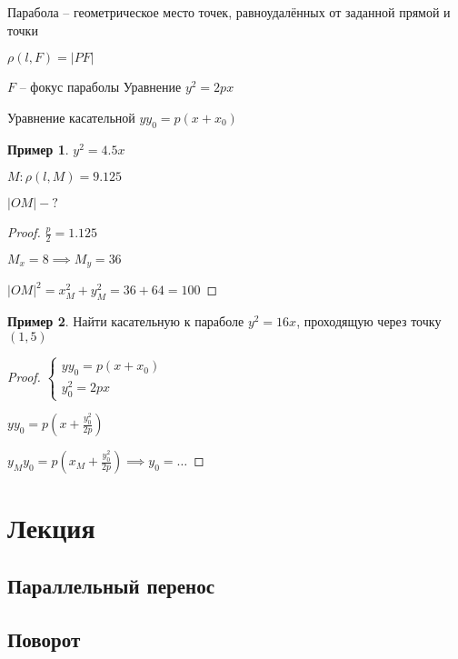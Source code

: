 \documentclass{book}
\theoremstyle{definition}
\newtheorem*{example}{Пример}
\newcommand{\incfig}[1]{%
    \def\svgwidth{\columnwidth}
    {#1.pdf_tex}
}
\begin{document}
\begin{definition}
    Парабола -- геометрическое место точек, равноудалённых от заданной прямой и точки

    $\rho(l, F) = |PF|$


$F$ -- фокус параболы
Уравнение  $y^2 = 2px$

Уравнение касательной $yy_0 = p(x+x_0)$
\end{definition}

\begin{example}
    $y^2 = 4.5 x$

    $M: \rho(l, M) = 9.125$

     $\left| OM \right| -?$
\end{example}
\begin{proof}
    $\frac{p}{2} = 1.125$ 

    $M_x = 8\implies M_y = 36$

    $\left| OM \right|^2 = x_M^2 + y_M^2 = 36+64 =100 $
\end{proof}
\begin{example}
    Найти касательную к параболе $y^2 = 16x$, проходящую через точку $(1,5)$
\end{example}
\begin{proof}
    $\begin{cases}
        yy_0 = p(x+x_0)\\
        y_0^2 = 2px
    \end{cases}$ 

    $yy_0 = p\left( x + \frac{y_0^2}{2p} \right) $

    $y_My_0 = p\left( x_M + \frac{y_0^2}{2p} \right) \implies y_0 = \ldots$
\end{proof}
\section{Лекция}
\subsection{Параллельный перенос}

\subsection{Поворот}
\end{document}
